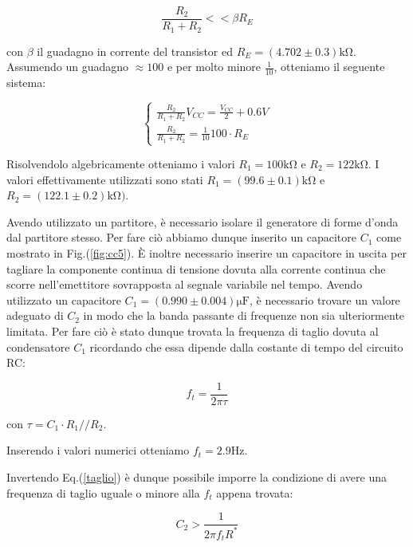\begin{equation}
\frac{R_2}{R_1+R_2} <<\beta R_E
\label{partitore2}
\end{equation}

con $\beta$ il guadagno in corrente del transistor ed $R_E=(4.702\pm0.3)\si{\kilo\ohm}$. Assumendo un guadagno $\approx 100$ e per molto minore $\frac{1}{10}$, otteniamo il seguente sistema:

\begin{equation}
\begin{cases}
\frac{R_2}{R_1+R_2} V_{CC}=\frac{V_{CC}}{2} + 0.6V\\
\frac{R_2}{R_1+R_2} =\frac{1}{10} 100 \cdot R_E
\end{cases}
\end{equation}


Risolvendolo algebricamente otteniamo i valori $R_1=100\si{\kilo\ohm}$ e $R_2=122\si{\kilo\ohm}$. I valori effettivamente utilizzati sono stati $R_1=(99.6\pm0.1)\si{\kilo\ohm}$ e $R_2=(122.1\pm0.2) \si{\kilo\ohm})$.

Avendo utilizzato un partitore, è necessario isolare il generatore di forme d'onda dal partitore stesso. Per fare ciò abbiamo dunque inserito un capacitore $C_1$ come mostrato in Fig.(\ref{fig:cc5}).
\`E inoltre necessario inserire un capacitore in uscita per tagliare la componente continua di tensione dovuta alla corrente continua che scorre nell'emettitore sovrapposta al segnale variabile nel tempo. 
Avendo utilizzato un capacitore $C_1=(0.990\pm0.004)\si{\micro\farad}$, è necessario trovare un valore adeguato di $C_2$ in modo che la banda passante di frequenze non sia ulteriormente limitata. Per fare ciò è stato dunque trovata la frequenza di taglio dovuta al condensatore $C_1$ ricordando che essa dipende dalla costante di tempo del circuito RC:

\begin{equation}
f_t=\frac{1}{2\pi \tau} 
\label{taglio}
\end{equation}

con $\tau=C_1 \cdot R_1//R_2$.

Inserendo i valori numerici otteniamo $f_t=2.9 \si{\hertz}$.


Invertendo Eq.(\ref{taglio}) è dunque possibile imporre la condizione di avere una frequenza di taglio uguale o minore alla $f_t$ appena trovata: 

\begin{equation}
C_2>\frac{1}{2\pi f_t R^*}
\end{equation}

